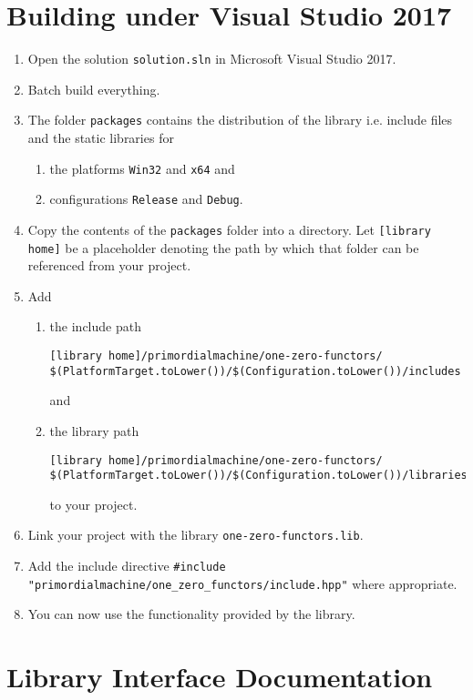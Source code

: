 \documentclass[oneside]{article}
\begin{document}
\section{Building under Visual Studio 2017}
\begin{enumerate}
\item Open the solution \texttt{solution.sln} in Microsoft Visual Studio 2017.
\item Batch build everything.
\item The folder \texttt{packages} contains the distribution of the library i.e. include files and the
      static libraries for
  \begin{enumerate}
    \item the platforms \texttt{Win32} and \texttt{x64} and
    \item configurations \texttt{Release} and \texttt{Debug}.
  \end{enumerate}
\item Copy the contents of the \verb+packages+ folder into a directory. Let
      \verb+[library home]+ be a placeholder denoting the path by which that folder
      can be referenced from your project.
\item Add
  \begin{enumerate}
    \item the include path
\begin{verbatim}
[library home]/primordialmachine/one-zero-functors/
$(PlatformTarget.toLower())/$(Configuration.toLower())/includes
\end{verbatim}
	and
    \item the library path
\begin{verbatim}
[library home]/primordialmachine/one-zero-functors/
$(PlatformTarget.toLower())/$(Configuration.toLower())/libraries
\end{verbatim}
    to your project.
\end{enumerate}
\item Link your project with the library \verb+one-zero-functors.lib+.
\item Add the include directive \verb+#include "primordialmachine/one_zero_functors/include.hpp"+ where appropriate.
\item You can now use the functionality provided by the library.
\end{enumerate}

\section{Library Interface Documentation}
\end{document}
